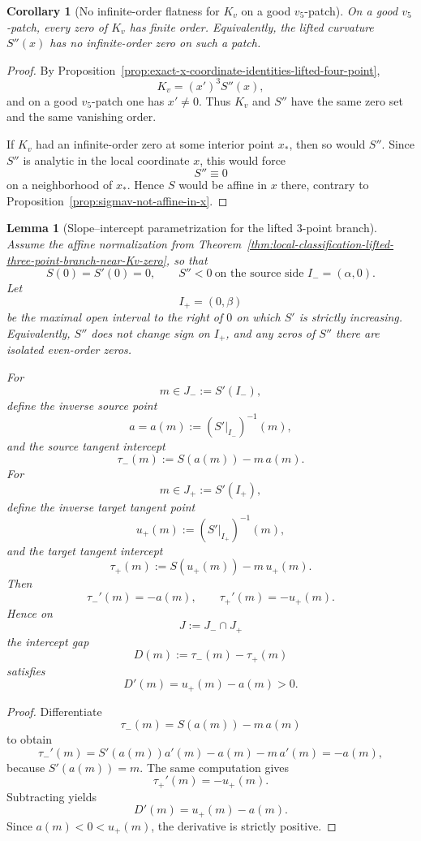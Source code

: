 \documentclass[11pt,a4paper]{amsart}
\theoremstyle{plain}
\newtheorem{lemma}[theorem]{Lemma}
\newtheorem{corollary}[theorem]{Corollary}
\theoremstyle{definition}
\begin{document}
\begin{corollary}[No infinite-order flatness for $K_v$ on a good $v_5$-patch]
\label{cor:no-infinite-order-flatness-Kv-good-vpatch}
On a good $v_5$-patch, every zero of $K_v$ has finite order.
Equivalently, the lifted curvature $S''(x)$ has no infinite-order zero on such a
patch.
\end{corollary}

\begin{proof}
By Proposition~\ref{prop:exact-x-coordinate-identities-lifted-four-point},
\[
K_v=(x')^3S''(x),
\]
and on a good $v_5$-patch one has $x'\neq 0$. Thus $K_v$ and $S''$ have the
same zero set and the same vanishing order.

If $K_v$ had an infinite-order zero at some interior point $x_*$, then so would
$S''$. Since $S''$ is analytic in the local coordinate $x$, this would force
\[
S''\equiv 0
\]
on a neighborhood of $x_*$. Hence $S$ would be affine in $x$ there, contrary to
Proposition~\ref{prop:sigmav-not-affine-in-x}.
\end{proof}

\begin{lemma}[Slope--intercept parametrization for the lifted $3$-point branch]
\label{lem:slope-intercept-parametrization-lifted-three-point}
Assume the affine normalization from
Theorem~\ref{thm:local-classification-lifted-three-point-branch-near-Kv-zero},
so that
\[
S(0)=S'(0)=0,
\qquad
S''<0\ \text{on the source side }I_-=(\alpha,0).
\]
Let
\[
I_+=(0,\beta)
\]
be the maximal open interval to the right of $0$ on which $S'$ is strictly
increasing. Equivalently, $S''$ does not change sign on $I_+$, and any zeros of
$S''$ there are isolated even-order zeros.

For
\[
m\in J_-:=S'(I_-),
\]
define the inverse source point
\[
a=a(m):=(S'|_{I_-})^{-1}(m),
\]
and the source tangent intercept
\[
\tau_-(m):=S(a(m))-m\,a(m).
\]
For
\[
m\in J_+:=S'(I_+),
\]
define the inverse target tangent point
\[
u_+(m):=(S'|_{I_+})^{-1}(m),
\]
and the target tangent intercept
\[
\tau_+(m):=S(u_+(m))-m\,u_+(m).
\]
Then
\[
\tau_-'(m)=-a(m),
\qquad
\tau_+'(m)=-u_+(m).
\]
Hence on
\[
J:=J_-\cap J_+
\]
the intercept gap
\[
D(m):=\tau_-(m)-\tau_+(m)
\]
satisfies
\[
D'(m)=u_+(m)-a(m)>0.
\]
\end{lemma}

\begin{proof}
Differentiate
\[
\tau_-(m)=S(a(m))-m\,a(m)
\]
to obtain
\[
\tau_-'(m)=S'(a(m))a'(m)-a(m)-m\,a'(m)=-a(m),
\]
because $S'(a(m))=m$. The same computation gives
\[
\tau_+'(m)=-u_+(m).
\]
Subtracting yields
\[
D'(m)=u_+(m)-a(m).
\]
Since $a(m)<0<u_+(m)$, the derivative is strictly positive.
\end{proof}
\end{document}
